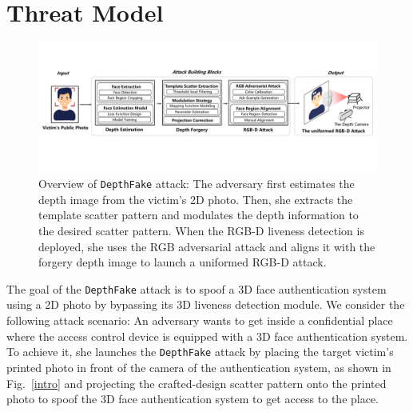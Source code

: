 \section{Threat Model}


\begin{figure}[pt]
	\centerline{\includegraphics[width = \textwidth]{figures/overview.pdf}}
	\vspace{-0.1in}
	\caption{Overview of \texttt{DepthFake} attack: The adversary first estimates the depth image from the victim's 2D photo. Then, she extracts the template scatter pattern and modulates the depth information to the desired scatter pattern. When the RGB-D liveness detection is deployed, she uses the RGB adversarial attack and aligns it with the forgery depth image to launch a uniformed RGB-D attack.}
	\label{overview}
	\vspace{-0.15in}
\end{figure}

The goal of the \texttt{DepthFake} attack is to spoof a 3D face authentication system using a 2D photo by bypassing its 3D liveness detection module. We consider the following attack scenario: An adversary wants to get inside a confidential place where the access control device is equipped with  a 3D face authentication system. To achieve it, she launches the \texttt{DepthFake} attack by placing the target victim's printed photo in front of the camera of the authentication system, as shown in Fig.~\ref{intro} and projecting the crafted-design scatter pattern onto the printed photo to spoof the 3D face authentication system to get access to the place.
%
%


